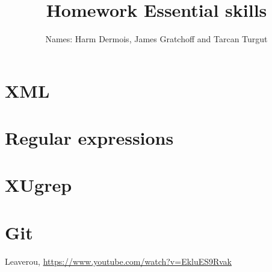 \documentclass[12pt,a4paper]{article}
\begin{document}
\title{Homework Essential skills}
\author{Names: Harm Dermois, James Gratchoff and Tarcan Turgut }
\date{}
\maketitle

\section{XML}

\section{Regular expressions}

\section{XUgrep}

\section{Git}


\begin{thebibliography}{9}
	Leaverou,
	\url{https://www.youtube.com/watch?v=EkluES9Rvak}

\end{thebibliography}
\end{document}
